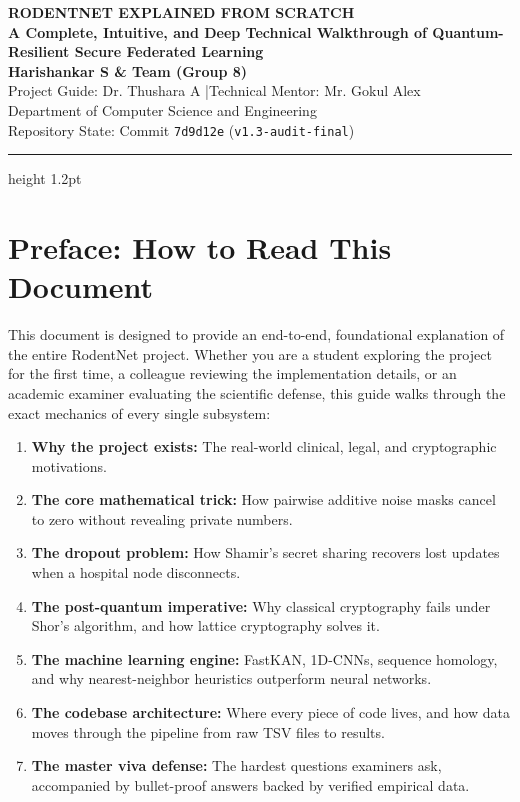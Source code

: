 \documentclass[11pt,a4paper]{report}
\begin{document}
\begin{center}
  {\Huge \textbf{RODENTNET EXPLAINED FROM SCRATCH}}\\[0.4cm]
  {\LARGE \textbf{A Complete, Intuitive, and Deep Technical Walkthrough of Quantum-Resilient Secure Federated Learning}}\\[0.6cm]
  {\large \textbf{Harishankar S \& Team (Group 8)}}\\[0.2cm]
  {\normalsize Project Guide: Dr. Thushara A \quad|\quad Technical Mentor: Mr. Gokul Alex}\\[0.15cm]
  {\small Department of Computer Science and Engineering}\\[0.15cm]
  {\footnotesize Repository State: Commit \texttt{7d9d12e} (\texttt{v1.3-audit-final})}\\[0.4cm]
  \hrule height 1.2pt
\end{center}
\vspace{0.4cm}

\section*{Preface: How to Read This Document}
This document is designed to provide an end-to-end, foundational explanation of the entire RodentNet project. Whether you are a student exploring the project for the first time, a colleague reviewing the implementation details, or an academic examiner evaluating the scientific defense, this guide walks through the exact mechanics of every single subsystem:
\begin{enumerate}[itemsep=2pt]
  \item \textbf{Why the project exists:} The real-world clinical, legal, and cryptographic motivations.
  \item \textbf{The core mathematical trick:} How pairwise additive noise masks cancel to zero without revealing private numbers.
  \item \textbf{The dropout problem:} How Shamir's secret sharing recovers lost updates when a hospital node disconnects.
  \item \textbf{The post-quantum imperative:} Why classical cryptography fails under Shor's algorithm, and how lattice cryptography solves it.
  \item \textbf{The machine learning engine:} FastKAN, 1D-CNNs, sequence homology, and why nearest-neighbor heuristics outperform neural networks.
  \item \textbf{The codebase architecture:} Where every piece of code lives, and how data moves through the pipeline from raw TSV files to results.
  \item \textbf{The master viva defense:} The hardest questions examiners ask, accompanied by bullet-proof answers backed by verified empirical data.
\end{enumerate}
\end{document}
